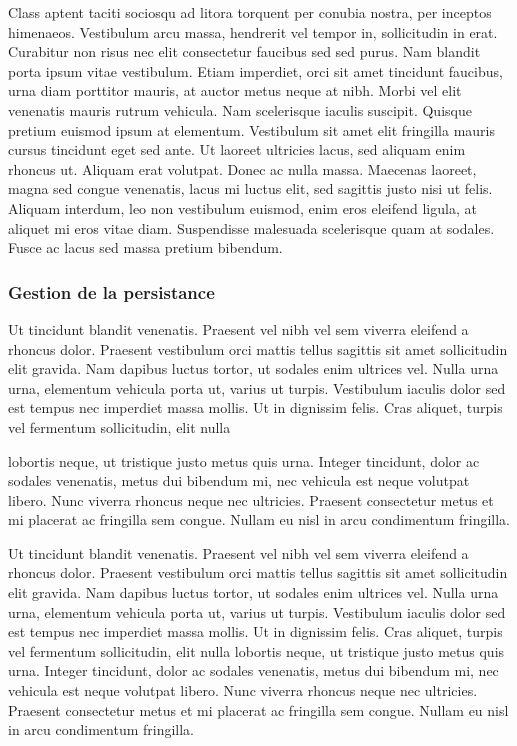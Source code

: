 Class aptent taciti sociosqu ad litora torquent per conubia nostra, per inceptos himenaeos. Vestibulum arcu massa, hendrerit vel tempor in, sollicitudin in erat. Curabitur non risus nec elit consectetur faucibus sed sed purus. Nam blandit porta ipsum vitae vestibulum. Etiam imperdiet, orci sit amet tincidunt faucibus, urna diam porttitor mauris, at auctor metus neque at nibh. Morbi vel elit venenatis mauris rutrum vehicula. Nam scelerisque iaculis suscipit. Quisque pretium euismod ipsum at elementum. Vestibulum sit amet elit fringilla mauris cursus tincidunt eget sed ante. Ut laoreet ultricies lacus, sed aliquam enim rhoncus ut. Aliquam erat volutpat. Donec ac nulla massa. Maecenas laoreet, magna sed congue venenatis, lacus mi luctus elit, sed sagittis justo nisi ut felis. Aliquam interdum, leo non vestibulum euismod, enim eros eleifend ligula, at aliquet mi eros vitae diam. Suspendisse malesuada scelerisque quam at sodales. Fusce ac lacus sed massa pretium bibendum. 

\subsubsection{Gestion de la persistance}

Ut tincidunt blandit venenatis. Praesent vel nibh vel sem viverra eleifend a rhoncus dolor. Praesent vestibulum orci mattis tellus sagittis sit amet sollicitudin elit gravida. Nam dapibus luctus tortor, ut sodales enim ultrices vel. Nulla urna urna, elementum vehicula porta ut, varius ut turpis. Vestibulum iaculis dolor sed est tempus nec imperdiet massa mollis. Ut in dignissim felis. Cras aliquet, turpis vel fermentum sollicitudin, elit
nulla

lobortis neque, ut tristique justo metus quis urna. Integer tincidunt, dolor ac sodales venenatis, metus dui bibendum mi, nec vehicula est neque volutpat libero. Nunc viverra rhoncus neque nec ultricies. Praesent consectetur metus et mi placerat ac fringilla sem congue. Nullam eu nisl in arcu condimentum fringilla. 

Ut tincidunt blandit venenatis. Praesent vel nibh vel sem viverra eleifend a rhoncus dolor. Praesent vestibulum orci mattis tellus sagittis sit amet sollicitudin elit gravida. Nam dapibus luctus tortor, ut sodales enim ultrices vel. Nulla urna urna, elementum vehicula porta ut, varius ut turpis. Vestibulum iaculis dolor sed est tempus nec imperdiet massa mollis. Ut in dignissim felis. Cras aliquet, turpis vel fermentum sollicitudin, elit nulla lobortis neque, ut tristique justo metus quis urna. Integer tincidunt, dolor ac sodales venenatis, metus dui bibendum mi, nec vehicula est neque volutpat libero. Nunc viverra rhoncus neque nec ultricies. Praesent consectetur metus et mi placerat ac fringilla sem congue. Nullam eu nisl in arcu condimentum fringilla. 
